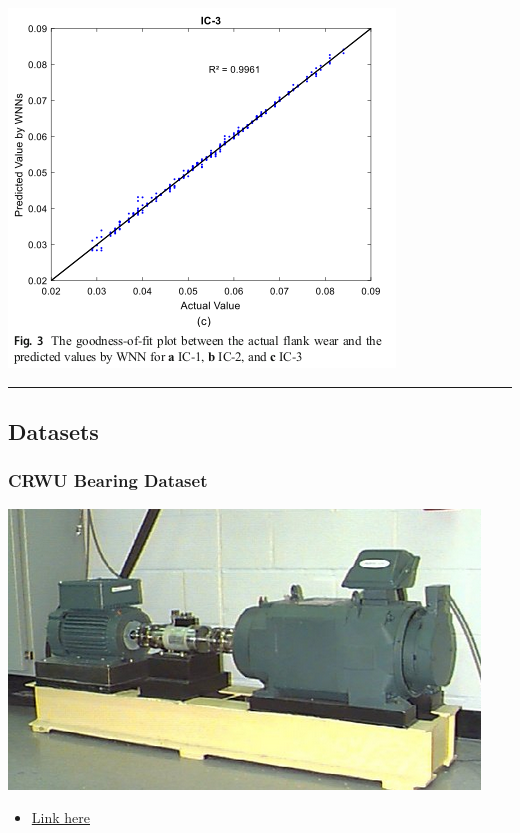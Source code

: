 \documentclass[
  letterpaper,
  DIV=11,
  numbers=noendperiod]{scrartcl}
\providecommand{\tightlist}{%
  \setlength{\itemsep}{0pt}\setlength{\parskip}{0pt}}\usepackage{longtable,booktabs,array}
\begin{document}
\begin{itemize}
  \includegraphics{img/2023-01-09-13-01-36.png}
\end{itemize}

\begin{center}\rule{0.5\linewidth}{0.5pt}\end{center}

\hypertarget{datasets}{%
\subsection{Datasets}\label{datasets}}

\hypertarget{crwu-bearing-dataset}{%
\subsubsection{CRWU Bearing Dataset}\label{crwu-bearing-dataset}}

\includegraphics{img/2023-01-08-19-36-39.png}

\begin{itemize}
\tightlist
\item
  \href{https://engineering.case.edu/bearingdatacenter/download-data-file}{Link
  here}
\end{itemize}
\end{document}
